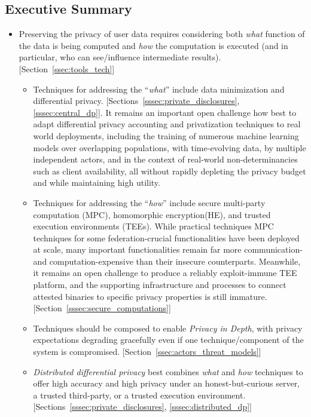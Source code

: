 \subsection{Executive Summary}
\begin{itemize}
    \item Preserving the privacy of user data requires considering both {\em what} function of the data is being computed and {\em how} the computation is executed (and in particular, who can see/influence intermediate results). [Section~\ref{ssec:tools_tech}] 
    \begin{itemize}
        \item Techniques for addressing the ``{\em what}'' include data minimization and differential privacy.  [Sections~\ref{sssec:private_disclosures}, \ref{sssec:central_dp}].  It remains an important open challenge how best to adapt differential privacy accounting and privatization techniques to real world deployments, including the training of numerous machine learning models over overlapping populations, with time-evolving data, by multiple independent actors, and in the context of real-world non-determinancies such as client availability, all without rapidly depleting the privacy budget and while maintaining high utility.
        \item Techniques for addressing the ``{\em how}'' include secure multi-party computation (MPC), homomorphic encryption(HE), and trusted execution environments (TEEs).  While practical techniques MPC techniques for some federation-crucial functionalities have been deployed at scale, many important functionalities remain far more communication- and computation-expensive than their insecure counterparts.  Meanwhile, it remains an open challenge to produce a reliably exploit-immune TEE platform, and the supporting infrastructure and processes to connect attested binaries to specific privacy properties is still immature. [Section~\ref{sssec:secure_computations}]
        \item Techniques should be composed to enable {\em Privacy in Depth}, with privacy expectations degrading gracefully even if one technique/component of the system is compromised. [Section~\ref{ssec:actors_threat_models}]
        \item {\em Distributed differential privacy} best combines {\em what} and {\em how} techniques to offer high accuracy and high privacy under an honest-but-curious server, a trusted third-party, or a trusted execution environment.  [Sections~\ref{sssec:private_disclosures}, \ref{sssec:distributed_dp}]

\end{itemize}
\end{itemize}
